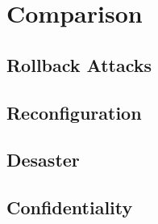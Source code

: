\section{Comparison}
\subsection{Rollback Attacks}
\subsection{Reconfiguration}
\subsection{Desaster}
\subsection{Confidentiality}